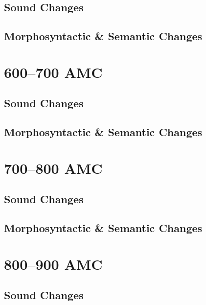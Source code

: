 \documentclass[a4paper,11pt,twoside,openany]{memoir}
\begin{document}
\subsection{Sound Changes}


\subsection{Morphosyntactic \& Semantic Changes}


\section{600--700 AMC}

\subsection{Sound Changes}


\subsection{Morphosyntactic \& Semantic Changes}


\section{700--800 AMC}

\subsection{Sound Changes}


\subsection{Morphosyntactic \& Semantic Changes}


\section{800--900 AMC}

\subsection{Sound Changes}

\end{document}
